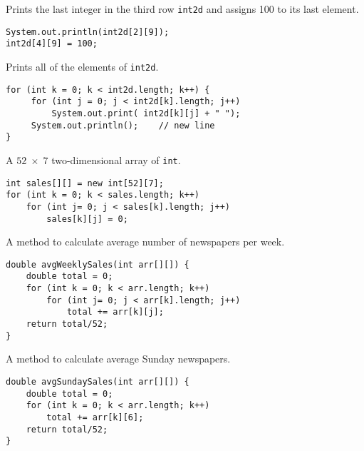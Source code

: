 \begin{ANS}
\item  Prints the last integer in the third row {\tt int2d} and
assigns 100 to its last element.

\begin{jjjlisting}
\begin{lstlisting}
System.out.println(int2d[2][9]);
int2d[4][9] = 100;
\end{lstlisting}
\end{jjjlisting}

\item  Prints all of the elements of {\tt int2d}.

\begin{jjjlisting}
\begin{lstlisting}
for (int k = 0; k < int2d.length; k++) {
     for (int j = 0; j < int2d[k].length; j++)
         System.out.print( int2d[k][j] + " ");
     System.out.println();    // new line
}
\end{lstlisting}
\end{jjjlisting}

\item  A $52\; \times \;7$ two-dimensional array of {\tt int}.

\begin{jjjlisting}
\begin{lstlisting}
int sales[][] = new int[52][7];
for (int k = 0; k < sales.length; k++)
    for (int j= 0; j < sales[k].length; j++)
        sales[k][j] = 0;
\end{lstlisting}
\end{jjjlisting}

\item  A method to calculate average number of newspapers per week.

\begin{jjjlisting}
\begin{lstlisting}
double avgWeeklySales(int arr[][]) {
    double total = 0;
    for (int k = 0; k < arr.length; k++)
        for (int j= 0; j < arr[k].length; j++)
            total += arr[k][j];
    return total/52;
}
\end{lstlisting}
\end{jjjlisting}

\item  A  method to calculate average Sunday newspapers.

\begin{jjjlisting}
\begin{lstlisting}
double avgSundaySales(int arr[][]) {
    double total = 0;
    for (int k = 0; k < arr.length; k++)
        total += arr[k][6];
    return total/52;
}
\end{lstlisting}
\end{jjjlisting}


\end{ANS}
